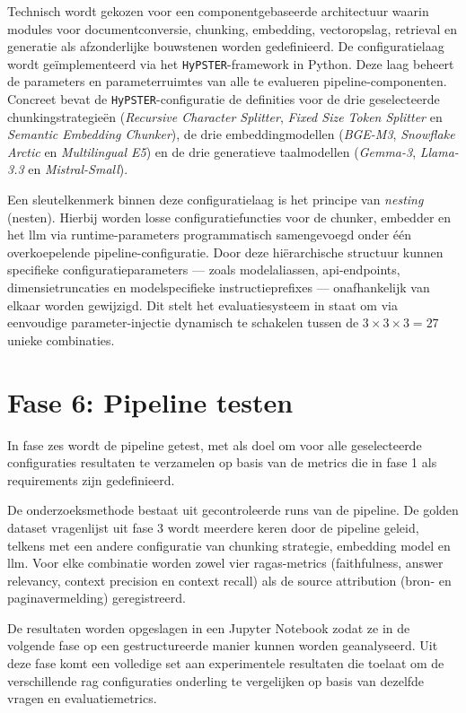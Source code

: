 Technisch wordt gekozen voor een componentgebaseerde architectuur waarin modules voor documentconversie, chunking, embedding, vectoropslag, retrieval en generatie als afzonderlijke bouwstenen worden gedefinieerd. De configuratielaag wordt geïmplementeerd via het \texttt{HyPSTER}-framework in Python. Deze laag beheert de parameters en parameterruimtes van alle te evalueren pipeline-componenten. Concreet bevat de \texttt{HyPSTER}-configuratie de definities voor de drie geselecteerde chunkingstrategieën (\textit{Recursive Character Splitter}, \textit{Fixed Size Token Splitter} en \textit{Semantic Embedding Chunker}), de drie embeddingmodellen (\textit{BGE-M3}, \textit{Snowflake Arctic} en \textit{Multilingual E5}) en de drie generatieve taalmodellen (\textit{Gemma-3}, \textit{Llama-3.3} en \textit{Mistral-Small}).

Een sleutelkenmerk binnen deze configuratielaag is het principe van \textit{nesting} (nesten). Hierbij worden losse configuratiefuncties voor de chunker, embedder en het \gls{llm} via runtime-parameters programmatisch samengevoegd onder één overkoepelende pipeline-configuratie. Door deze hiërarchische structuur kunnen specifieke configuratieparameters — zoals modelaliassen, \gls{api}-endpoints, dimensietruncaties en modelspecifieke instructieprefixes — onafhankelijk van elkaar worden gewijzigd. Dit stelt het evaluatiesysteem in staat om via eenvoudige parameter-injectie dynamisch te schakelen tussen de $3 \times 3 \times 3 = 27$ unieke combinaties.

\section{Fase 6: Pipeline testen}

In fase zes wordt de pipeline getest, met als doel om voor alle geselecteerde configuraties resultaten te verzamelen op basis van de metrics die in fase 1 als requirements zijn gedefinieerd.

De onderzoeksmethode bestaat uit gecontroleerde runs van de pipeline. De golden dataset vragenlijst uit fase 3 wordt meerdere keren door de pipeline geleid, telkens met een andere configuratie van chunking strategie, embedding model en \gls{llm}. Voor elke combinatie worden zowel vier \gls{ragas}-metrics (faithfulness, answer relevancy, context precision en context recall) als de source attribution (bron- en paginavermelding) geregistreerd.

De resultaten worden opgeslagen in een Jupyter Notebook zodat ze in de volgende fase op een gestructureerde manier kunnen worden geanalyseerd. Uit deze fase komt een volledige set aan experimentele resultaten die toelaat om de verschillende \gls{rag} configuraties onderling te vergelijken op basis van dezelfde vragen en evaluatiemetrics.

